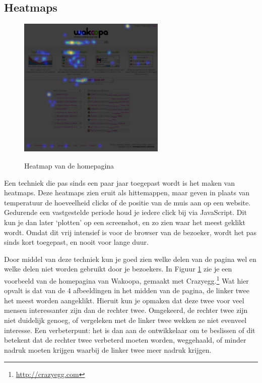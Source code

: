 \documentclass[a4paper, 10pt, pdftex]{report}
\begin{document}
    \subsection{Heatmaps}
      \begin{figure}
      \begin{center}
      \caption{Heatmap van de homepagina}
        \includegraphics[width=70mm]{../images/heatmap}
      \label{heatmap}
      \end{center}
    \end{figure}
    Een techniek die pas sinds een paar jaar toegepast wordt is het maken van heatmaps. Deze heatmaps zien eruit als hittemappen, maar geven in plaats van temperatuur de hoeveelheid clicks of de positie van de muis aan op een website. Gedurende een vastgestelde periode houd je iedere click bij via JavaScript. Dit kun je dan later `plotten' op een screenshot, en zo zien waar het meest geklikt wordt. Omdat dit vrij intensief is voor de browser van de bezoeker, wordt het pas sinds kort toegepast, en nooit voor lange duur.

    Door middel van deze techniek kun je goed zien welke delen van de pagina wel en welke delen niet worden gebruikt door je bezoekers. In Figuur \ref{heatmap} zie je een voorbeeld van de homepagina van Wakoopa, gemaakt met Crazyegg.\footnote{\url{http://crazyegg.com}} Wat hier opvalt is dat van de 4 afbeeldingen in het midden van de pagina, de linker twee het meest worden aangeklikt. Hieruit kun je opmaken dat deze twee voor veel mensen interessanter zijn dan de rechter twee. Omgekeerd, de rechter twee zijn niet duidelijk genoeg, of vergeleken met de linker twee wekken ze niet evenveel interesse. Een verbeterpunt: het is dan aan de ontwikkelaar om te beslissen of dit betekent dat de rechter twee verbeterd moeten worden, weggehaald, of minder nadruk moeten krijgen waarbij de linker twee meer nadruk krijgen.
\end{document}
